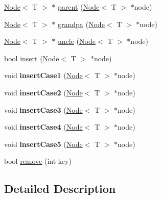 \begin{DoxyCompactItemize}
\hyperlink{class_node}{Node}$<$ T $>$ $\ast$ \hyperlink{class_r_b_tree_aabfe3497ee633a9864ec84fdb153c67d}{parent} (\hyperlink{class_node}{Node}$<$ T $>$ $\ast$node)
\item 
\hyperlink{class_node}{Node}$<$ T $>$ $\ast$ \hyperlink{class_r_b_tree_a9c1ef0de31b6bf2617a458a0e9d0bcef}{grandpa} (\hyperlink{class_node}{Node}$<$ T $>$ $\ast$node)
\item 
\hyperlink{class_node}{Node}$<$ T $>$ $\ast$ \hyperlink{class_r_b_tree_af60f8017b52f69173e0af61c8e581b48}{uncle} (\hyperlink{class_node}{Node}$<$ T $>$ $\ast$node)
\item 
bool \hyperlink{class_r_b_tree_a8f67ba964a14d252ff6851a46576399e}{insert} (\hyperlink{class_node}{Node}$<$ T $>$ $\ast$node)
\item 
\hypertarget{class_r_b_tree_af588082e194aecea7a6c2438f685f2cd}{}void {\bfseries insert\+Case1} (\hyperlink{class_node}{Node}$<$ T $>$ $\ast$node)\label{class_r_b_tree_af588082e194aecea7a6c2438f685f2cd}

\item 
\hypertarget{class_r_b_tree_ace7e466e4b1412df108d9d88fcceffbf}{}void {\bfseries insert\+Case2} (\hyperlink{class_node}{Node}$<$ T $>$ $\ast$node)\label{class_r_b_tree_ace7e466e4b1412df108d9d88fcceffbf}

\item 
\hypertarget{class_r_b_tree_ad20010a77dd3e98f1737f5cbc2aa72c0}{}void {\bfseries insert\+Case3} (\hyperlink{class_node}{Node}$<$ T $>$ $\ast$node)\label{class_r_b_tree_ad20010a77dd3e98f1737f5cbc2aa72c0}

\item 
\hypertarget{class_r_b_tree_a0b05cf578a21098cf28451c7c1dea619}{}void {\bfseries insert\+Case4} (\hyperlink{class_node}{Node}$<$ T $>$ $\ast$node)\label{class_r_b_tree_a0b05cf578a21098cf28451c7c1dea619}

\item 
\hypertarget{class_r_b_tree_ab1d1644cf1e55879f32aeb1415c24b18}{}void {\bfseries insert\+Case5} (\hyperlink{class_node}{Node}$<$ T $>$ $\ast$node)\label{class_r_b_tree_ab1d1644cf1e55879f32aeb1415c24b18}

\item 
bool \hyperlink{class_r_b_tree_a9a20aef5e8862b34bccc3d1f1c47a321}{remove} (int key)
\end{DoxyCompactItemize}


\subsection{Detailed Description}
